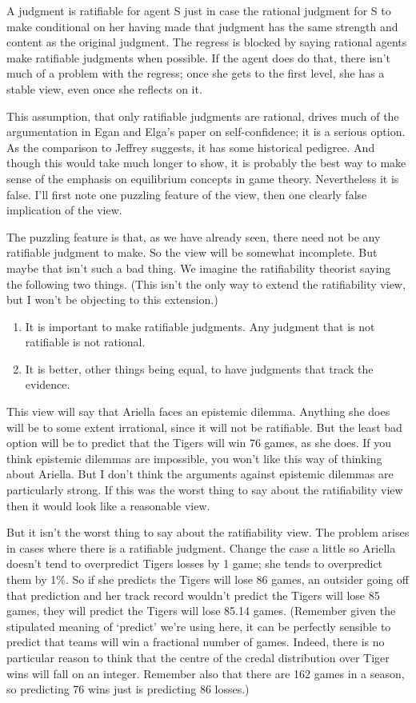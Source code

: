 \documentclass[
  10pt,
  letterpaper,
  twoside]{scrbook}
\providecommand{\tightlist}{%
  \setlength{\itemsep}{0pt}\setlength{\parskip}{0pt}}\usepackage{longtable,booktabs,array}
\begin{document}
A judgment is ratifiable for agent S just in case the rational judgment
for S to make conditional on her having made that judgment has the same
strength and content as the original judgment. The regress is blocked by
saying rational agents make ratifiable judgments when possible. If the
agent does do that, there isn't much of a problem with the regress; once
she gets to the first level, she has a stable view, even once she
reflects on it.

This assumption, that only ratifiable judgments are rational, drives
much of the argumentation in Egan and Elga's paper on self-confidence;
it is a serious option. As the comparison to Jeffrey suggests, it has
some historical pedigree. And though this would take much longer to
show, it is probably the best way to make sense of the emphasis on
equilibrium concepts in game theory. Nevertheless it is false. I'll
first note one puzzling feature of the view, then one clearly false
implication of the view.

The puzzling feature is that, as we have already seen, there need not be
any ratifiable judgment to make. So the view will be somewhat
incomplete. But maybe that isn't such a bad thing. We imagine the
ratifiability theorist saying the following two things. (This isn't the
only way to extend the ratifiability view, but I won't be objecting to
this extension.)

\begin{enumerate}
\def\labelenumi{\arabic{enumi}.}
\tightlist
\item
  It is important to make ratifiable judgments. Any judgment that is not
  ratifiable is not rational.
\item
  It is better, other things being equal, to have judgments that track
  the evidence.
\end{enumerate}

This view will say that {Ariella} faces an epistemic dilemma. Anything
she does will be to some extent irrational, since it will not be
ratifiable. But the least bad option will be to predict that the Tigers
will win 76 games, as she does. If you think epistemic dilemmas are
impossible, you won't like this way of thinking about {Ariella}. But I
don't think the arguments against epistemic dilemmas are particularly
strong. If this was the worst thing to say about the ratifiability view
then it would look like a reasonable view.

But it isn't the worst thing to say about the ratifiability view. The
problem arises in cases where there is a ratifiable judgment. Change the
case a little so {Ariella} doesn't tend to overpredict Tigers losses by
1 game; she tends to overpredict them by 1\%. So if she predicts the
Tigers will lose 86 games, an outsider going off that prediction and her
track record wouldn't predict the Tigers will lose 85 games, they will
predict the Tigers will lose 85.14 games. (Remember given the stipulated
meaning of `predict' we're using here, it can be perfectly sensible to
predict that teams will win a fractional number of games. Indeed, there
is no particular reason to think that the centre of the credal
distribution over Tiger wins will fall on an integer. Remember also that
there are 162 games in a season, so predicting 76 wins just is
predicting 86 losses.)
\end{document}
